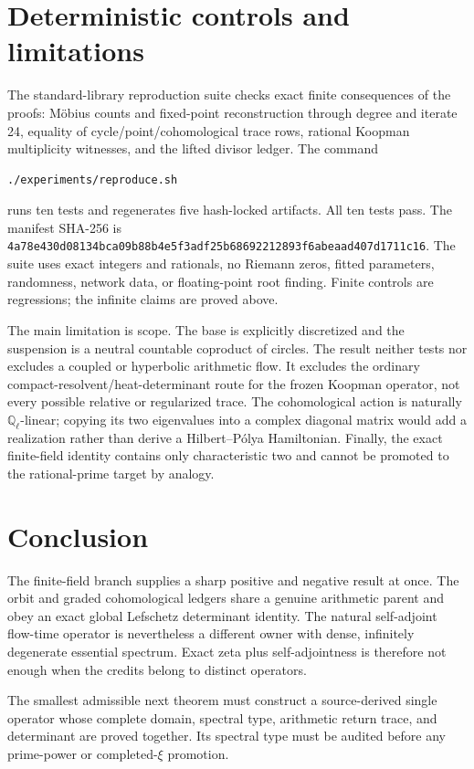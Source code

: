 \documentclass[11pt]{article}
\theoremstyle{remark}\newtheorem{remark}[theorem]{Remark}
\newcommand{\Q}{\mathbb Q}
\begin{document}
\section{Deterministic controls and limitations}

The standard-library reproduction suite checks exact finite consequences of
the proofs: Möbius counts and fixed-point reconstruction through degree and
iterate 24, equality of cycle/point/cohomological trace rows, rational
Koopman multiplicity witnesses, and the lifted divisor ledger.  The command
\begin{verbatim}
./experiments/reproduce.sh
\end{verbatim}
runs ten tests and regenerates five hash-locked artifacts.  All ten tests
pass.  The manifest SHA-256 is
\texttt{4a78e430d08134bca09b88b4e5f3adf25b68692212893f6abeaad407d1711c16}.
The suite uses exact integers and rationals, no Riemann zeros, fitted
parameters, randomness, network data, or floating-point root finding.
Finite controls are regressions; the infinite claims are proved above.

The main limitation is scope.  The base is explicitly discretized and the
suspension is a neutral countable coproduct of circles.  The result neither
tests nor excludes a coupled or hyperbolic arithmetic flow.  It excludes the
ordinary compact-resolvent/heat-determinant route for the frozen Koopman
operator, not every possible relative or regularized trace.  The
cohomological action is naturally \(\Q_\ell\)-linear; copying its two
eigenvalues into a complex diagonal matrix would add a realization rather
than derive a Hilbert--Pólya Hamiltonian.  Finally, the exact finite-field
identity contains only characteristic two and cannot be promoted to the
rational-prime target by analogy.

\section{Conclusion}

The finite-field branch supplies a sharp positive and negative result at
once.  The orbit and graded cohomological ledgers share a genuine arithmetic
parent and obey an exact global Lefschetz determinant identity.  The natural
self-adjoint flow-time operator is nevertheless a different owner with dense,
infinitely degenerate essential spectrum.  Exact zeta plus self-adjointness is
therefore not enough when the credits belong to distinct operators.

The smallest admissible next theorem must construct a source-derived single
operator whose complete domain, spectral type, arithmetic return trace, and
determinant are proved together.  Its spectral type must be audited before
any prime-power or completed-\(\xi\) promotion.
\end{document}
